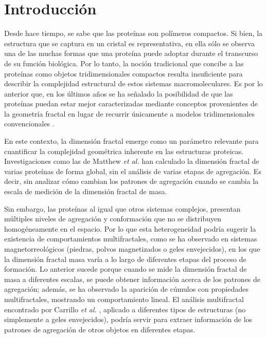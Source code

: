 \chapter{Introducci\'{o}n}

Desde hace tiempo, se sabe que las prote\'{i}nas son pol\'{i}meros compactos. Si bien, la estructura que se captura en un cristal es representativa, en ella s\'{o}lo se observa una de las muchas formas que una prote\'{i}na puede adoptar durante el transcurso de su funci\'{o}n biol\'{o}gica. Por lo tanto, la noci\'{o}n tradicional que concibe a las prote\'{i}nas como objetos tridimensionales compactos resulta insuficiente para describir la complejidad estructural de estos sistemas macromoleculares. Es por lo anterior que, en los \'{u}ltimos años se ha señalado la posibilidad de que las prote\'{i}nas puedan estar mejor caracterizadas mediante conceptos provenientes de la geometr\'{i}a fractal en lugar de recurrir \'{u}nicamente a modelos tridimensionales convencionales \cite{Dewey1997, Mustafa1996, Vicsek1992 	, Cserzo1991}.

En este contexto, la dimensi\'{o}n fractal emerge como un par\'{a}metro relevante para cuantificar la complejidad geom\'{e}trica inherente en las estructuras proteicas. Investigaciones como las de Matthew \textit{et al.} \cite{Enright2005, Enright2006} han calculado la dimensi\'{o}n fractal de varias prote\'{i}nas de forma global, sin el an\'{a}lisis de varias etapas de agregaci\'{o}n. Es decir, sin analizar c\'{o}mo cambian los patrones de agregaci\'{o}n cuando se cambia la escala de medici\'{o}n de la dimensi\'{o}n fractal de masa.


Sin embargo, las prote\'{i}nas al igual que otros sistemas complejos, presentan m\'{u}ltiples niveles de agregaci\'{o}n y conformaci\'{o}n que no se distribuyen homog\'{e}neamente en el espacio. Por lo que esta heterogeneidad podr\'{i}a sugerir la existencia de comportamientos multifractales, como se ha observado en sistemas magnetorreol\'{o}gicos (piedras, polvos magnetizados o geles envejecidos), en los que la dimensi\'{o}n fractal masa var\'{i}a a lo largo de diferentes etapas del proceso de formaci\'{o}n. Lo anterior sucede porque cuando se mide la dimensi\'{o}n fractal de masa a diferentes escalas, se puede obtener informaci\'{o}n acerca de los patrones de agregaci\'{o}n; adem\'{a}s, se ha observado la aparici\'{o}n de c\'{u}mulos  con propiedades multifractales, mostrando un comportamiento lineal. El an\'{a}lisis multifractal encontrado por Carrillo \textit{et al.} \cite{Carrillo2003}, aplicado a diferentes tipos de estructuras (no simplemente a geles envejecidos), podr\'{i}a servir para extraer informaci\'{o}n de los patrones de agregaci\'{o}n de otros objetos en diferentes etapas. 

